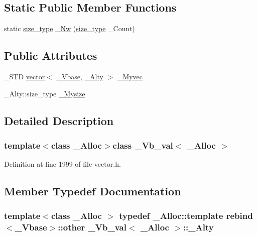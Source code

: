 \subsection*{Static Public Member Functions}
\begin{DoxyCompactItemize}
\item 
static \hyperlink{class___vb__val_aae6aa10bcd41d235b46f128df1198612}{size\+\_\+type} \hyperlink{class___vb__val_a4d2e656ee706fbd56939891618fa9057}{\+\_\+\+Nw} (\hyperlink{class___vb__val_aae6aa10bcd41d235b46f128df1198612}{size\+\_\+type} \+\_\+\+Count)
\end{DoxyCompactItemize}
\subsection*{Public Attributes}
\begin{DoxyCompactItemize}
\item 
\+\_\+\+S\+T\+D \hyperlink{classvector}{vector}$<$ \hyperlink{vector_8h_a1555a2f621ba9ade75bb9ce8bca77144}{\+\_\+\+Vbase}, \hyperlink{class___vb__val_a20c01f1d8456573db64c3f9098bb5eda}{\+\_\+\+Alty} $>$ \hyperlink{class___vb__val_a767a14d1ad38891dbf939ef319bab983}{\+\_\+\+Myvec}
\item 
\+\_\+\+Alty\+::size\+\_\+type \hyperlink{class___vb__val_accdd2cf575b73798e173b94f8c30dedc}{\+\_\+\+Mysize}
\end{DoxyCompactItemize}


\subsection{Detailed Description}
\subsubsection*{template$<$class \+\_\+\+Alloc$>$class \+\_\+\+Vb\+\_\+val$<$ \+\_\+\+Alloc $>$}



Definition at line 1999 of file vector.\+h.



\subsection{Member Typedef Documentation}
\hypertarget{class___vb__val_a20c01f1d8456573db64c3f9098bb5eda}{
\subsubsection[{\+\_\+\+Alty}]{\setlength{\rightskip}{0pt plus 5cm}template$<$class \+\_\+\+Alloc $>$ typedef \+\_\+\+Alloc\+::template rebind$<${\bf \+\_\+\+Vbase}$>$\+::other {\bf \+\_\+\+Vb\+\_\+val}$<$ \+\_\+\+Alloc $>$\+::{\bf \+\_\+\+Alty}}}\label{class___vb__val_a20c01f1d8456573db64c3f9098bb5eda}



